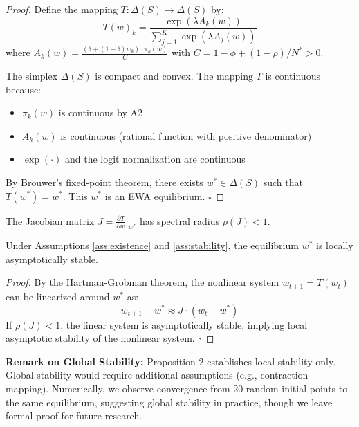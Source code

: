\begin{proof}
Define the mapping $T: \Delta(S) \to \Delta(S)$ by:
\begin{equation}
T(w)_k = \frac{\exp(\lambda A_k(w))}{\sum_{j=1}^K \exp(\lambda A_j(w))}
\end{equation}
where $A_k(w) = \frac{(\delta + (1-\delta) w_k) \cdot \pi_k(w)}{C}$ with $C = 1 - \phi + (1-\rho)/N^* > 0$.

The simplex $\Delta(S)$ is compact and convex. The mapping $T$ is continuous because:
\begin{itemize}
    \item $\pi_k(w)$ is continuous by A2
    \item $A_k(w)$ is continuous (rational function with positive denominator)
    \item $\exp(\cdot)$ and the logit normalization are continuous
\end{itemize}

By Brouwer's fixed-point theorem, there exists $w^* \in \Delta(S)$ such that $T(w^*) = w^*$. This $w^*$ is an EWA equilibrium. $\square$
\end{proof}

\begin{assumption}
\label{ass:stability}
The Jacobian matrix $J = \frac{\partial T}{\partial w}\big|_{w^*}$ has spectral radius $\rho(J) < 1$.
\end{assumption}

\begin{proposition}
\label{prop:stability}
Under Assumptions \ref{ass:existence} and \ref{ass:stability}, the equilibrium $w^*$ is locally asymptotically stable.
\end{proposition}

\begin{proof}
By the Hartman-Grobman theorem, the nonlinear system $w_{t+1} = T(w_t)$ can be linearized around $w^*$ as:
\begin{equation}
w_{t+1} - w^* \approx J \cdot (w_t - w^*)
\end{equation}
If $\rho(J) < 1$, the linear system is asymptotically stable, implying local asymptotic stability of the nonlinear system. $\square$
\end{proof}

\textbf{Remark on Global Stability:} Proposition 2 establishes local stability only. Global stability would require additional assumptions (e.g., contraction mapping). Numerically, we observe convergence from 20 random initial points to the same equilibrium, suggesting global stability in practice, though we leave formal proof for future research.

